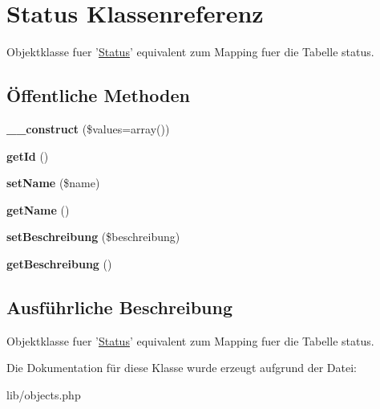 \hypertarget{classStatus}{\section{\-Status \-Klassenreferenz}
\label{classStatus}
}


\-Objektklasse fuer '\hyperlink{classStatus}{\-Status}' equivalent zum \-Mapping fuer die \-Tabelle status.  


\subsection*{Öffentliche \-Methoden}
\begin{DoxyCompactItemize}
\item 
\hypertarget{classStatus_a2a52b74efa937b48826aa426feca36dd}{{\bfseries \-\_\-\-\_\-construct} (\$values=array())}\label{classStatus_a2a52b74efa937b48826aa426feca36dd}

\item 
\hypertarget{classStatus_af744c3badd8e8bc9cf748025ef9a554e}{{\bfseries get\-Id} ()}\label{classStatus_af744c3badd8e8bc9cf748025ef9a554e}

\item 
\hypertarget{classStatus_a9defcdef8d9ba3f9ef3fdc9c7e6d5ad1}{{\bfseries set\-Name} (\$name)}\label{classStatus_a9defcdef8d9ba3f9ef3fdc9c7e6d5ad1}

\item 
\hypertarget{classStatus_a4ee39b598b62c32ef010d5d5ce72a81a}{{\bfseries get\-Name} ()}\label{classStatus_a4ee39b598b62c32ef010d5d5ce72a81a}

\item 
\hypertarget{classStatus_a4464234c107f30785a181b034eba28d9}{{\bfseries set\-Beschreibung} (\$beschreibung)}\label{classStatus_a4464234c107f30785a181b034eba28d9}

\item 
\hypertarget{classStatus_a60df18424a5a08961432976d3cc88398}{{\bfseries get\-Beschreibung} ()}\label{classStatus_a60df18424a5a08961432976d3cc88398}

\end{DoxyCompactItemize}


\subsection{\-Ausführliche \-Beschreibung}
\-Objektklasse fuer '\hyperlink{classStatus}{\-Status}' equivalent zum \-Mapping fuer die \-Tabelle status. 

\-Die \-Dokumentation für diese \-Klasse wurde erzeugt aufgrund der \-Datei\-:\begin{DoxyCompactItemize}
\item 
lib/objects.\-php\end{DoxyCompactItemize}
